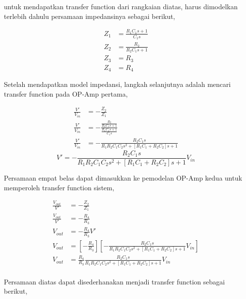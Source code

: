 \documentclass[12pt]{journal}
\begin{document}
untuk mendapatkan transfer function dari rangkaian diatas, harus dimodelkan terlebih dahulu persamaan impedansinya sebagai berikut,

\begin{equation}
    \begin{split}
        Z_1 &= \frac{R_1C_1s+1}{C_1s} \\[5pt]
        Z_2 &= \frac{R_2}{R_2C_1s+1} \\[5pt]
        Z_3 &= R_3 \\[5pt]
        Z_4 &= R_4
    \end{split}
\end{equation}

Setelah mendapatkan model impedansi, langkah selanjutnya adalah mencari transfer function pada OP-Amp pertama,

\begin{equation*}
    \begin{split}
        \frac{V'}{V_{in}} &= -\frac{Z_2}{Z_1} \\[5pt]
        \frac{V'}{V_{in}} &= -\frac{\frac{R_2}{R_2C_1s+1}}{\frac{R_1C_1s+1}{C_1s}} \\[5pt]
        \frac{V'}{V_{in}} &= -\frac{R_2C_1s}{R_1R_2C_1C_2s^2+[R_1C_1+R_2C_2]s+1}
    \end{split}
\end{equation*}
\begin{equation}
    V' = -\frac{R_2C_1s}{R_1R_2C_1C_2s^2+[R_1C_1+R_2C_2]s+1}V_{in}
\end{equation}

Persamaan empat belas dapat dimasukkan ke pemodelan OP-Amp kedua untuk memperoleh transfer function sistem,

\begin{equation*}
    \begin{split}
        \frac{V_{out}}{V'} &= -\frac{Z_2}{Z_1} \\[5pt]
        \frac{V_{out}}{V'} &= -\frac{R_4}{R_3} \\[5pt]
        V_{out} &= -\frac{R_4}{R_3}V' \\[5pt]
        V_{out} &= [-\frac{R_4}{R_3}][-\frac{R_2C_1s}{R_1R_2C_1C_2s^2+[R_1C_1+R_2C_2]s+1}V_{in}] \\[5pt]
        V_{out} &= \frac{R_4}{R_3}\frac{R_2C_1s}{R_1R_2C_1C_2s^2+[R_1C_1+R_2C_2]s+1}V_{in} \\[5pt]
    \end{split}
\end{equation*}

Persamaan diatas dapat disederhanakan menjadi transfer function sebagai berikut,
\end{document}
